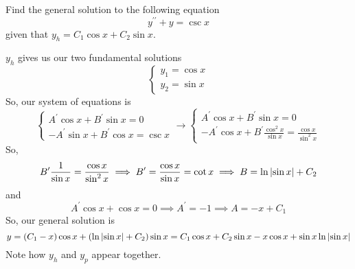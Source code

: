 \begin{example}
	Find the general solution to the following equation
	\begin{equation*}
		y^{\prime\prime} + y = \csc{x}
	\end{equation*}
	given that $y_h = C_1\cos{x} + C_2\sin{x}$.
\end{example}
\noindent
$y_h$ gives us our two fundamental solutions
\begin{equation*}
	\begin{cases}
		y_1 = \cos{x} \\
		y_2 = \sin{x}
	\end{cases}
\end{equation*}
So, our system of equations is
\begin{equation*}
	\begin{cases}
		A^\prime\cos{x} + B^\prime\sin{x} = 0 \\
		-A^\prime\sin{x} + B^\prime\cos{x} = \csc{x}
	\end{cases} \to \begin{cases}
		A^\prime\cos{x} + B^\prime\sin{x} = 0 \\
		-A^\prime\cos{x} + B^\prime\frac{\cos^{2}{x}}{\sin{x}} = \frac{\cos{x}}{\sin^{2}{x}}
	\end{cases}
\end{equation*}
So, 
\begin{equation*}
	B^\prime\frac{1}{\sin{x}} = \frac{\cos{x}}{\sin^{2}{x}} \implies B^\prime = \frac{\cos{x}}{\sin{x}} = \cot{x} \implies B = \ln{\lvert \sin{x} \rvert} + C_2
\end{equation*}
and
\begin{equation*}
	A^\prime\cos{x} + \cos{x} = 0 \implies A^\prime = -1 \implies A = -x + C_1
\end{equation*}
So, our general solution is
\begin{equation*}
	y = \left(C_1 - x\right)\cos{x} + \left(\ln{\lvert \sin{x} \rvert} + C_2\right)\sin{x} = C_1\cos{x} + C_2\sin{x} - x\cos{x} + \sin{x}\ln{\lvert \sin{x} \rvert}
\end{equation*}
Note how $y_h$ and $y_p$ appear together.